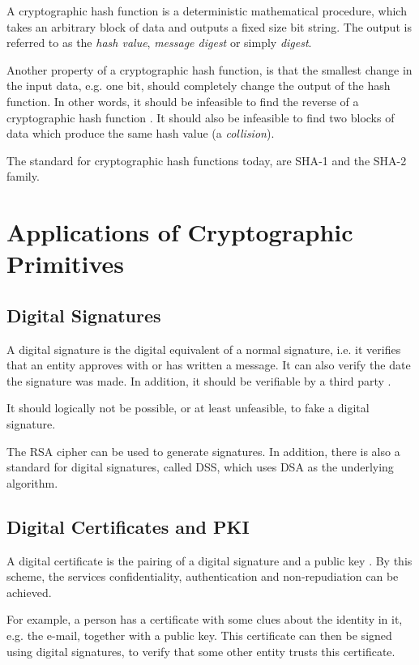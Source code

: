 \documentclass[pdftex,english,10pt,b5paper,twoside]{book}
\begin{document}
A cryptographic hash function is a deterministic mathematical procedure, which
takes an arbitrary block of data and outputs a fixed size bit string. The
output is referred to as the \emph{hash value}, \emph{message digest} or simply
\emph{digest}.

Another property of a cryptographic hash function, is that the
smallest change in the input data, e.g. one bit, should completely change the
output of the hash function. In other words, it should be infeasible to find the
reverse of a cryptographic hash function \cite[p. 335]{stallings}. It should
also be infeasible to find two blocks of data which produce the same hash value
(a \emph{collision}).

The standard for cryptographic hash functions today, are \ac{SHA}-1 and the
\ac{SHA}-2 family.

\section{Applications of Cryptographic Primitives}

\subsection{Digital Signatures}

A digital signature is the digital equivalent of a normal signature, i.e. it
verifies that an entity approves with or has written a message. It can also
verify the date the signature was made. In addition, it should be verifiable by
a third party \cite[p.  379]{stallings}. 

It should logically not be possible, or at least unfeasible, to fake a digital
signature.

The \ac{RSA} cipher can be used to generate signatures. In addition, there is also a
standard for digital signatures, called \ac{DSS}, which uses \ac{DSA} as the
underlying algorithm.

\subsection{Digital Certificates and PKI}

A digital certificate is the pairing of a digital signature and a public key
\cite{stallings}. By this scheme, the services confidentiality, authentication
and non-repudiation can be achieved. 

For example, a person has a certificate with some clues about the identity
in it, e.g. the e-mail, together with a public key. This certificate can then
be signed using digital signatures, to verify that some other entity trusts this
certificate.
\end{document}
